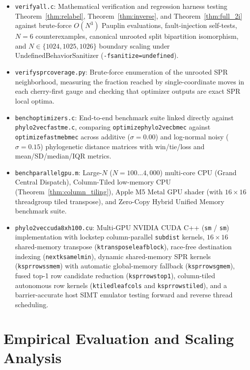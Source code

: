 \documentclass[11pt,a4paper]{article}
\makeatletter
\DeclareRobustCommand{\_}{\ifmmode\nfss@text{\textunderscore}\else\textunderscore\allowbreak\fi}
\theoremstyle{definition}
\makeatother
\begin{document}
\begin{itemize}
    \item \texttt{verify\_all.c}: Mathematical verification and regression harness testing Theorem~\ref{thm:relabel}, Theorem~\ref{thm:inverse}, and Theorem~\ref{thm:full_2i} against brute-force $O(N^3)$ Pauplin evaluations, fault-injection self-tests, $N=6$ counterexamples, canonical unrooted split bipartition isomorphism, and $N \in \{1024, 1025, 1026\}$ boundary scaling under UndefinedBehaviorSanitizer (\texttt{-fsanitize=undefined}).
    \item \texttt{verify\_spr\_coverage.py}: Brute-force enumeration of the unrooted SPR neighborhood, measuring the fraction reached by single-coordinate moves in each cherry-first gauge and checking that optimizer outputs are exact SPR local optima.
    \item \texttt{bench\_optimizers.c}: End-to-end benchmark suite linked directly against \texttt{phylo2vec\_fastme.c}, comparing \texttt{optimize\_phylo2vec\_bme\_c} against \texttt{optimize\_fastme\_bme\_c} across additive ($\sigma = 0.00$) and log-normal noisy ($\sigma = 0.15$) phylogenetic distance matrices with win/tie/loss and mean/SD/median/IQR metrics.
    \item \texttt{bench\_parallel\_gpu.m}: Large-$N$ ($N = 100 \dots 4{,}000$) multi-core CPU (Grand Central Dispatch), Column-Tiled low-memory CPU (Theorem~\ref{thm:column_tiling}), Apple M5 Metal GPU shader (with $16 \times 16$ threadgroup tiled transpose), and Zero-Copy Hybrid Unified Memory benchmark suite.
    \item \texttt{phylo2vec\_cuda\_8xh100.cu}: Multi-GPU NVIDIA CUDA C++ (\texttt{sm\_90} / \texttt{sm\_100}) implementation with lockstep column-parallel \texttt{subdist} kernels, $16 \times 16$ shared-memory transpose (\texttt{k\_transpose\_leaf\_block}), race-free destination indexing (\texttt{next\_k\_same\_lmin}), dynamic shared-memory SPR kernels (\texttt{k\_spr\_rows\_smem}) with automatic global-memory fallback (\texttt{k\_spr\_rows\_gmem}), fused top-1 row candidate reduction (\texttt{k\_spr\_rows\_top1}), column-tiled autonomous row kernels (\texttt{k\_tiled\_leaf\_cols} and \texttt{k\_spr\_rows\_tiled}), and a barrier-accurate host SIMT emulator testing forward and reverse thread scheduling.
\end{itemize}

\section{Empirical Evaluation and Scaling Analysis}
\label{sec:experiments}
\end{document}
